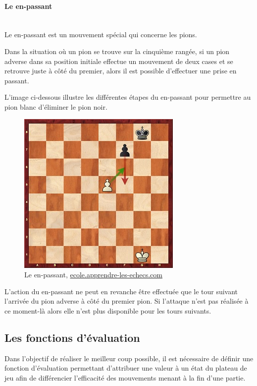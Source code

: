 \huge\documentclass{article}
\begin{document}
\paragraph{Le en-passant}
~~\\

Le en-passant est un mouvement spécial qui concerne les pions.

Dans la situation où un pion se trouve sur la cinquième rangée, si un pion adverse dans sa position initiale effectue un mouvement de deux cases et se retrouve juste à côté du premier, alors il est possible d'effectuer une prise en passant.

L'image ci-dessous illustre les différentes étapes du en-passant pour permettre au pion blanc d'éliminer le pion noir.

\begin{figure}[!h]
\centering
\includegraphics[scale=0.8]{img/en-passant.jpg}
\caption{Le en-passant,
\href{https://ecole.apprendre-les-echecs.com/la-prise-en-passant/}{ecole.apprendre-les-echecs.com}}
\end{figure}

L'action du en-passant ne peut en revanche être effectuée que le tour suivant l'arrivée du pion adverse à côté du premier pion. Si l'attaque n'est pas réalisée à ce moment-là alors elle n'est plus disponible pour les tours suivants.

\subsection{Les fonctions d'évaluation}\label{heuristique_contexte}
Dans l'objectif de réaliser le meilleur coup possible, il est nécessaire de définir une fonction d'évaluation permettant d'attribuer une valeur à un état du plateau de jeu afin de différencier l'efficacité des mouvements menant à la fin d'une partie.
\end{document}
